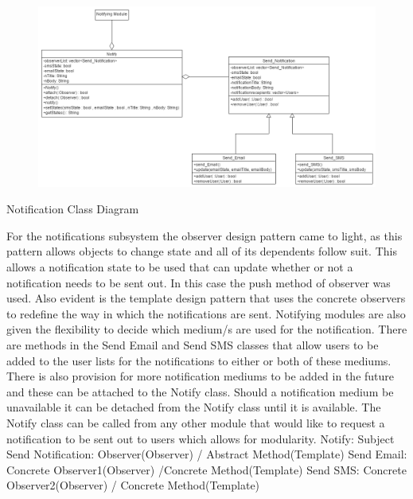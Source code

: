 \documentclass{article}
\begin{document}
\begin{figure}[h!]
  \includegraphics[width=\textwidth]{Notifications_Class_Diagram.png}
\end{figure}
Notification Class Diagram
\begin{flushleft}
For the notifications subsystem the observer design pattern came to light, as this pattern allows objects to change state and all of its dependents follow suit. This allows a notification state to be used that can update whether or not a notification needs to be sent out. In this case the push method of observer was used. Also evident is the template design pattern that uses the concrete observers to redefine the way in which the notifications are sent. Notifying modules are also given the flexibility to decide which medium/s are used for the notification.
\bigskip
\newline
There are methods in the Send Email and Send SMS classes that allow users to be added to the user lists for the notifications to either or both of these mediums. There is also provision for more notification mediums to be added in the future and these can be attached to the Notify class. Should a notification medium be unavailable it can be detached from the Notify class until it is available. The Notify class can be called from any other module that would like to request a notification to be sent out to users which allows for modularity.
\bigskip
\newline
Notify: Subject
\newline
Send Notification: Observer(Observer) / Abstract Method(Template)
\newline
Send Email: Concrete Observer1(Observer) /Concrete Method(Template)
\newline
Send SMS: Concrete Observer2(Observer) / Concrete Method(Template)
\end{flushleft}
\mbox{}\\
\bigskip
\clearpage
\end{document}

